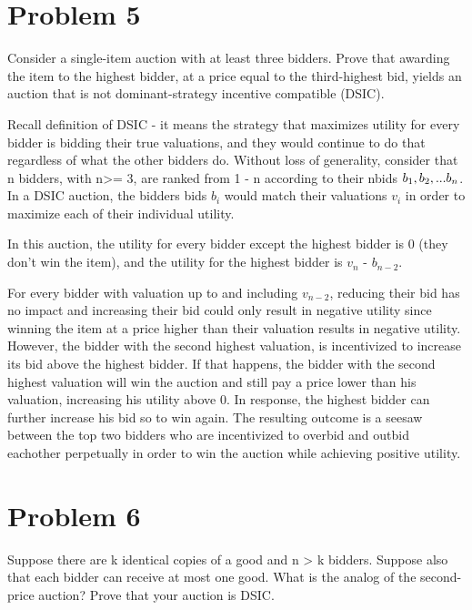 \documentclass{article}
\begin{document}
\section*{Problem 5}
Consider a single-item auction with at least three bidders. Prove that awarding the item to the highest bidder, at a price equal to the third-highest bid, yields an auction that is not dominant-strategy incentive
compatible (DSIC).

Recall definition of DSIC - it means the strategy that maximizes utility for
every bidder is bidding their true valuations, and they would continue to do
that regardless of what the other bidders do.  Without loss of generality,
consider that n bidders, with n>= 3,  are ranked from 1 - n according to their
nbids $b\textsubscript{1}, b_2, ... b_n$. In a DSIC auction, the bidders bids
$b_i$ would match their valuations $v_i$ in order to maximize each of their
individual utility.  

In this auction, the utility for every bidder except the highest bidder is 0
(they don't win the item), and the utility for the highest bidder is $v_n$ -
$b_{n-2}$.

For every bidder with valuation up to and including $v_{n-2}$, reducing their
bid has no impact and increasing their bid could only result in negative
utility since winning the item at a price higher than their valuation results
in negative utility. However, the bidder with the second highest valuation,
is incentivized to increase its bid above the highest bidder. If that
happens, the bidder with the second highest valuation will win the auction and
still pay a price lower than his valuation, increasing his utility above 0. In
response, the highest bidder can further increase his bid so to win again.
The resulting outcome is a seesaw between the top two bidders who are
incentivized to overbid and outbid eachother perpetually in order to win the
auction while achieving positive utility.

\section*{Problem 6}

Suppose there are k identical copies of a good and n > k bidders. Suppose also that each bidder can receive
at most one good. What is the analog of the second-price auction? Prove that your auction is DSIC.
\end{document}

